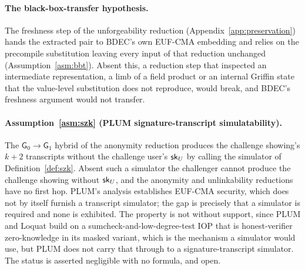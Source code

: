 %

\paragraph{The black-box-transfer hypothesis.}
The freshness step of the unforgeability reduction (Appendix~\ref{app:preservation}) hands the extracted pair to BDEC's own EUF-CMA embedding and relies on the precompile substitution leaving every input of that reduction unchanged (Assumption~\ref{asm:bbt}). Absent this, a reduction step that inspected an intermediate representation, a limb of a field product or an internal Griffin state that the value-level substitution does not reproduce, would break, and BDEC's freshness argument would not transfer.

\paragraph{Assumption~\ref{asm:szk} (PLUM signature-transcript simulatability).}
The $\mathsf G_0\to\mathsf G_1$ hybrid of the anonymity reduction produces the challenge showing's $k+2$ transcripts without the challenge user's $\mathsf{sk}_U$ by calling the simulator of Definition~\ref{def:szk}. Absent such a simulator the challenger cannot produce the challenge showing without $\mathsf{sk}_U$, and the anonymity and unlinkability reductions have no first hop. PLUM's analysis establishes EUF-CMA security, which does not by itself furnish a transcript simulator; the gap is precisely that a simulator is required and none is exhibited. The property is not without support, since PLUM and Loquat build on a sumcheck-and-low-degree-test IOP that is honest-verifier zero-knowledge in its masked variant, which is the mechanism a simulator would use, but PLUM does not carry that through to a signature-transcript simulator. The status is asserted negligible with no formula, and open.

